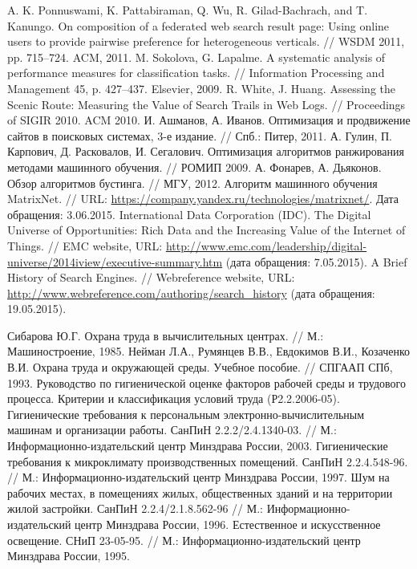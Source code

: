 \documentclass[12pt,a4paper]{report}
\begin{document}
\begin{thebibliography}{@}
   A. K. Ponnuswami, K. Pattabiraman, Q. Wu,
R. Gilad-Bachrach, and T. Kanungo. On composition of a federated web search result page: Using online users to provide pairwise preference for heterogeneous verticals. //  WSDM 2011, pp. 715–724. ACM, 2011.
   M. Sokolova, G. Lapalme. A systematic analysis of performance measures for classification tasks. // Information Processing and Management 45, p. 427–437. Elsevier, 2009.
   R. White, J. Huang. Assessing the Scenic Route: Measuring the Value of Search Trails in Web Logs. // Proceedings of SIGIR 2010. ACM 2010.    
 И. Ашманов, А. Иванов. Оптимизация и продвижение сайтов в поисковых системах, 3-е издание. // Спб.: Питер, 2011.
   А. Гулин, П. Карпович, Д. Расковалов,
И. Сегалович. Оптимизация алгоритмов ранжирования методами машинного обучения. // РОМИП 2009.
   А. Фонарев, А. Дьяконов. Обзор алгоритмов бустинга. // МГУ, 2012.
   Алгоритм машинного обучения MatrixNet. // URL: \url{https://company.yandex.ru/technologies/matrixnet/}. Дата обращения: 3.06.2015.               
 International Data Corporation (IDC). The Digital Universe of Opportunities: Rich Data and the Increasing Value of the Internet of Things. // EMC website,
  URL: \url{http://www.emc.com/leadership/digital-universe/2014iview/executive-summary.htm} (дата обращения: 7.05.2015).
 A Brief History of Search Engines. // Webreference website, 
  URL: \url{http://www.webreference.com/authoring/search_history} (дата обращения: 19.05.2015).

 Сибарова Ю.Г. Охрана труда в вычислительных центрах. // М.: Машиностроение, 1985.
 Нейман Л.А., Румянцев В.В., Евдокимов В.И., Козаченко В.И.
Охрана труда и окружающей среды. Учебное пособие. // СПГААП СПб, 1993.
 Руководство по гигиенической оценке факторов рабочей среды и трудового процесса. Критерии и классификация условий труда (Р2.2.2006-05).
 Гигиенические требования к персональным электронно-вычислительным машинам и организации работы. СанПиН 2.2.2/2.4.1340-03. //
М.: Информационно-издательский центр Минздрава России, 2003.
 Гигиенические требования к микроклимату производственных помещений. СанПиН 2.2.4.548-96. // М.: Информационно-издательский центр Минздрава России, 1997.
 Шум на рабочих местах, в помещениях жилых, общественных зданий и на территории жилой застройки. СанПиН 2.2.4/2.1.8.562-96 // М.: Информационно-издательский центр Минздрава России, 1996.
 Естественное и искусственное освещение. СНиП 23-05-95. // М.: Информационно-издательский центр Минздрава России, 1995.


\end{thebibliography}
\end{document}
